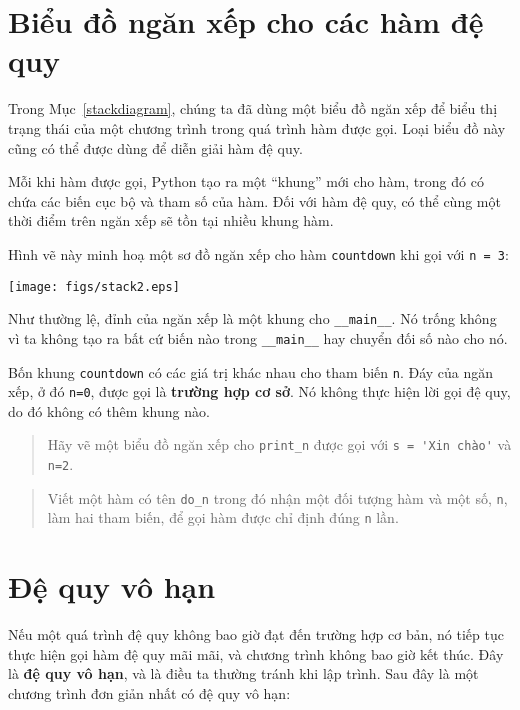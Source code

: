 \documentclass[11pt]{book}
\begin{document}
\section{Biểu đồ ngăn xếp cho các hàm đệ quy}

Trong Mục~\ref{stackdiagram}, chúng ta đã dùng một biểu đồ
ngăn xếp để biểu thị trạng thái của một chương trình trong quá
trình hàm được gọi. Loại biểu đồ này cũng có thể được dùng để
diễn giải hàm đệ quy.

Mỗi khi hàm được gọi, Python tạo ra một ``khung'' mới cho hàm,
trong đó có chứa các biến cục bộ và tham số của hàm. Đối với
hàm đệ quy, có thể cùng một thời điểm trên ngăn xếp sẽ tồn tại 
nhiều khung hàm.

Hình vẽ này minh hoạ một sơ đồ ngăn xếp cho hàm {\tt countdown} 
khi gọi với {\tt n = 3}:

\beforefig
\centerline{\texttt{[image: figs/stack2.eps]}}
\afterfig

Như thường lệ, đỉnh của ngăn xếp là một khung cho \verb"__main__".
Nó trống không vì ta không tạo ra bất cứ biến nào trong 
\verb"__main__" hay chuyển đối số nào cho nó.


Bốn khung {\tt countdown} có các giá trị khác nhau cho tham biến
{\tt n}. Đáy của ngăn xếp, ở đó {\tt n=0}, được gọi là 
{\bf trường hợp cơ sở}.  Nó không thực hiện lời gọi đệ quy, do đó
không có thêm khung nào.

\begin{quote}
Hãy vẽ một biểu đồ ngăn xếp cho \verb"print_n" được gọi với
\verb"s = 'Xin chào'" và {\tt n=2}.
\end{quote}

\begin{quote}
Viết một hàm có tên \verb"do_n" trong đó nhận một đối tượng hàm
và một số, {\tt n}, làm hai tham biến, để gọi hàm được chỉ định
đúng {\tt n} lần.
\end{quote}



\section{Đệ quy vô hạn}

Nếu một quá trình đệ quy không bao giờ đạt đến trường hợp cơ bản,
nó tiếp tục thực hiện gọi hàm đệ quy mãi mãi, và chương trình
không bao giờ kết thúc. Đây là {\bf đệ quy vô hạn}, và là điều ta 
thường tránh khi lập trình. Sau đây là một chương trình đơn giản nhất
có đệ quy vô hạn:
\end{document}
